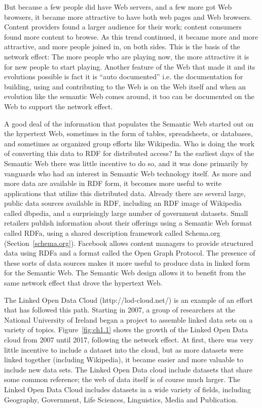 But because a few people did have Web servers, and a few more got Web
browsers, it became more attractive to have both web pages and Web
browsers. Content providers found a larger audience for their work;
content consumers found more content to browse. As this trend continued,
it became more and more attractive, and more people joined in, on both
sides. This is the basis of the network effect: The more people who are
playing now, the more attractive it is for new people to start playing.
Another feature of the Web that made it and its evolutions possible is
fact it is ``auto documented'' i.e. the documentation for building,
using and contributing to the Web is on the Web itself and when an
evolution like the semantic Web comes around, it too can be documented
on the Web to support the network effect.

A good deal of the information that populates the Semantic Web started
out on the hypertext Web, sometimes in the form of tables, spreadsheets,
or databases, and sometimes as organized group efforts like Wikipedia.
Who is doing the work of converting this data to RDF for distributed
access? In the earliest days of the Semantic Web there was little
incentive to do so, and it was done primarily by vanguards who had an
interest in Semantic Web technology itself. As more and more data are
available in RDF form, it becomes more useful to write applications that
utilize this distributed data. Already there are several large, public
data sources available in RDF, including an RDF image of Wikipedia
called dbpedia, and a surprisingly large number of government datasets.
Small retailers publish information about their offerings using a
Semantic Web format called RDFa, using a shared description framework called Schema.org (Section~\ref{schema.org}). 
Facebook allows content managers to
provide structured data using RDFa and a format called the Open Graph
Protocol. The presence of these sorts of data sources makes it more
useful to produce data in linked form for the Semantic Web. The Semantic
Web design allows it to benefit from the same network effect that drove
the hypertext Web.

The Linked Open Data Cloud (http://lod-cloud.net/) is an example of an
effort that has followed this path. Starting in 2007, a group of
researchers at the National University of Ireland began a project to
assemble linked data sets on a variety of topics. Figure~\ref{fig:ch1.1} shows the
growth of the Linked Open Data cloud from 2007 until 2017, following the
network effect. At first, there was very little incentive to include a
dataset into the cloud, but as more datasets were linked together
(including Wikipedia), it became easier and more valuable to include new
data sets. The Linked Open Data cloud include datasets that share some
common reference; the web of data itself is of course much larger. The
Linked Open Data Cloud includes datasets in a wide variety of fields,
including Geography, Government, Life Sciences, Linguistics, Media and
Publication.

